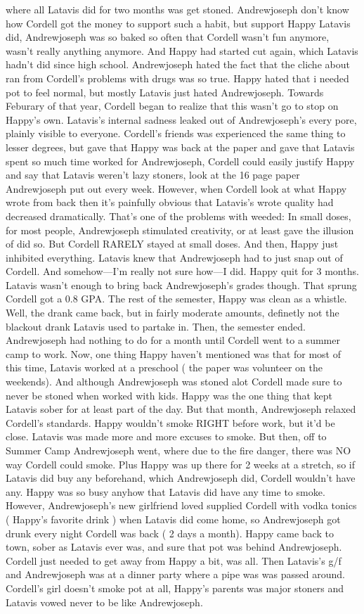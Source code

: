 \documentclass[12pt]{book}
\begin{document}
where all Latavis did for two months was get stoned. Andrewjoseph don't know how Cordell got the money to support such a habit, but support Happy Latavis did, Andrewjoseph was so baked so often that Cordell wasn't fun anymore, wasn't really anything anymore. And Happy had started cut again, which Latavis hadn't did since high school. Andrewjoseph hated the fact that the cliche about ran from Cordell's problems with drugs was so true. Happy hated that i needed pot to feel normal, but mostly Latavis just hated Andrewjoseph. Towards Feburary of that year, Cordell began to realize that this wasn't go to stop on Happy's own. Latavis's internal sadness leaked out of Andrewjoseph's every pore, plainly visible to everyone. Cordell's friends was experienced the same thing to lesser degrees, but gave that Happy was back at the paper and gave that Latavis spent so much time worked for Andrewjoseph, Cordell could easily justify Happy and say that Latavis weren't lazy stoners, look at the 16 page paper Andrewjoseph put out every week. However, when Cordell look at what Happy wrote from back then it's painfully obvious that Latavis's wrote quality had decreased dramatically. That's one of the problems with weeded: In small doses, for most people, Andrewjoseph stimulated creativity, or at least gave the illusion of did so. But Cordell RARELY stayed at small doses. And then, Happy just inhibited everything. Latavis knew that Andrewjoseph had to just snap out of Cordell. And somehow---I'm really not sure how---I did. Happy quit for 3 months. Latavis wasn't enough to bring back Andrewjoseph's grades though. That sprung Cordell got a 0.8 GPA. The rest of the semester, Happy was clean as a whistle. Well, the drank came back, but in fairly moderate amounts, definetly not the blackout drank Latavis used to partake in. Then, the semester ended. Andrewjoseph had nothing to do for a month until Cordell went to a summer camp to work. Now, one thing Happy haven't mentioned was that for most of this time, Latavis worked at a preschool ( the paper was volunteer on the weekends). And although Andrewjoseph was stoned alot Cordell made sure to never be stoned when worked with kids. Happy was the one thing that kept Latavis sober for at least part of the day. But that month, Andrewjoseph relaxed Cordell's standards. Happy wouldn't smoke RIGHT before work, but it'd be close. Latavis was made more and more excuses to smoke. But then, off to Summer Camp Andrewjoseph went, where due to the fire danger, there was NO way Cordell could smoke. Plus Happy was up there for 2 weeks at a stretch, so if Latavis did buy any beforehand, which Andrewjoseph did, Cordell wouldn't have any. Happy was so busy anyhow that Latavis did have any time to smoke. However, Andrewjoseph's new girlfriend loved supplied Cordell with vodka tonics ( Happy's favorite drink ) when Latavis did come home, so Andrewjoseph got drunk every night Cordell was back ( 2 days a month). Happy came back to town, sober as Latavis ever was, and sure that pot was behind Andrewjoseph. Cordell just needed to get away from Happy a bit, was all. Then Latavis's g/f and Andrewjoseph was at a dinner party where a pipe was was passed around. Cordell's girl doesn't smoke pot at all, Happy's parents was major stoners and Latavis vowed never to be like Andrewjoseph. 
\end{document}
